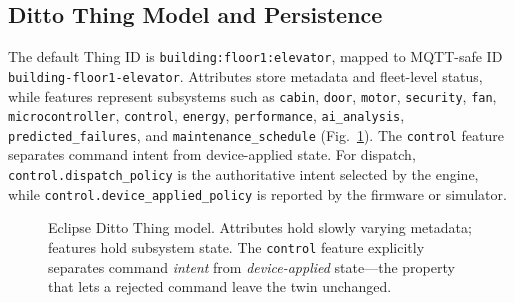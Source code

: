 \documentclass[journal]{IEEEtran}
\newcommand{\artifact}[1]{\texttt{#1}}
\newcommand{\thingid}{\artifact{building:floor1:elevator}}
\newcommand{\mqttid}{\artifact{building-floor1-elevator}}
\begin{document}
\subsection{Ditto Thing Model and Persistence}

The default Thing ID is \thingid, mapped to MQTT-safe ID \mqttid. Attributes store metadata and fleet-level status, while features represent subsystems such as \artifact{cabin}, \artifact{door}, \artifact{motor}, \artifact{security}, \artifact{fan}, \artifact{microcontroller}, \artifact{control}, \artifact{energy}, \artifact{performance}, \artifact{ai\_analysis}, \artifact{predicted\_failures}, and \artifact{maintenance\_schedule} (Fig.~\ref{fig:ditto-model}). The \artifact{control} feature separates command intent from device-applied state. For dispatch, \artifact{control.dispatch\_policy} is the authoritative intent selected by the engine, while \artifact{control.device\_applied\_policy} is reported by the firmware or simulator.

\begin{figure}[t]
\centering
{}
\caption{Eclipse Ditto Thing model. Attributes hold slowly varying metadata; features hold subsystem state. The \texttt{control} feature explicitly separates command \emph{intent} from \emph{device-applied} state---the property that lets a rejected command leave the twin unchanged.}
\label{fig:ditto-model}
\end{figure}
\end{document}
